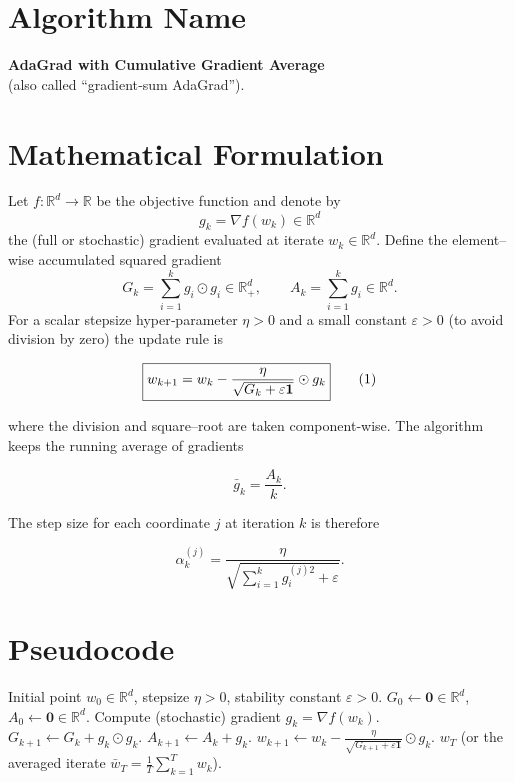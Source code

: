 \documentclass{article}
\newcommand{\R}{\mathbb{R}}
\begin{document}
\section*{Algorithm Name}
\textbf{AdaGrad with Cumulative Gradient Average}\\
(also called ``gradient‐sum AdaGrad'').

\section*{Mathematical Formulation}
Let $f:\R^{d}\rightarrow\R$ be the objective function and denote by 
\[
g_{k}= \nabla f(w_{k})\in\R^{d}
\]
the (full or stochastic) gradient evaluated at iterate $w_{k}\in\R^{d}$.  
Define the element–wise accumulated squared gradient
\[
G_{k}= \sum_{i=1}^{k} g_{i}\odot g_{i}\in\R^{d}_{+},
\qquad
A_{k}= \sum_{i=1}^{k} g_{i}\in\R^{d}.
\]
For a scalar stepsize hyper‑parameter $\eta>0$ and a small constant
$\varepsilon>0$ (to avoid division by zero) the update rule is  

\[
\boxed{%
w_{k+1}= w_{k} - \frac{\eta}{\sqrt{G_{k}+\varepsilon\mathbf 1}}\odot g_{k}
}
\tag{1}
\]

where the division and square–root are taken component‑wise.
The algorithm keeps the running average of gradients  

\[
\bar g_{k}= \frac{A_{k}}{k}.
\]

The step size for each coordinate $j$ at iteration $k$ is therefore  

\[
\alpha_{k}^{(j)} = \frac{\eta}{\sqrt{\sum_{i=1}^{k} g_{i}^{(j)2}+\varepsilon}} .
\tag{2}
\]

\section*{Pseudocode}
\begin{algorithm}[H]
\caption{AdaGrad (gradient‑sum version)}\label{alg:adagrad}
\begin{algorithmic}[1]
\REQUIRE Initial point $w_{0}\in\R^{d}$, stepsize $\eta>0$, 
stability constant $\varepsilon>0$.
\STATE $G_{0}\gets \mathbf 0\in\R^{d}$,\quad $A_{0}\gets \mathbf 0\in\R^{d}$.
    \STATE Compute (stochastic) gradient $g_{k}= \nabla f(w_{k})$.
    \STATE $G_{k+1}\gets G_{k}+ g_{k}\odot g_{k}$.
    \STATE $A_{k+1}\gets A_{k}+ g_{k}$.
    \STATE $\displaystyle w_{k+1}\gets 
          w_{k}-\frac{\eta}{\sqrt{G_{k+1}+\varepsilon\mathbf 1}}\odot g_{k}$.
\ENDFOR
\RETURN $w_{T}$ (or the averaged iterate $\bar w_{T}= \frac{1}{T}\sum_{k=1}^{T}w_{k}$).
\end{algorithmic}
\end{algorithm}
\end{document}
